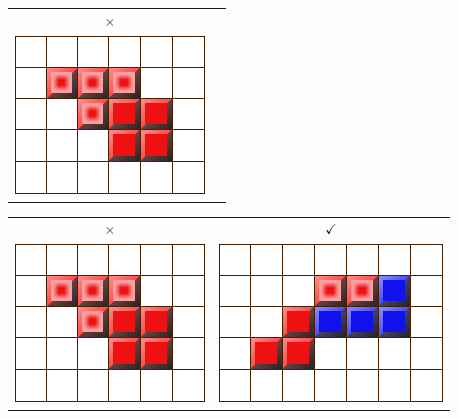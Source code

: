 \documentclass[12pt]{beamer}
\begin{document}
\begin{frame}
\begin{tabular}{c c}
	\huge \color{red} $\times$ & \\
	\includegraphics[width=0.5\linewidth]{media/how2play4.png}
	&
\end{tabular}
\end{frame}
\begin{frame}
\begin{tabular}{c c}
	\huge \color{red} $\times$ & \huge \color{green} $\checkmark$\\
	\includegraphics[width=0.5\linewidth]{media/how2play4.png}
	&
	\includegraphics[width=0.5\linewidth]{media/how2play5.png}
\end{tabular}
\end{frame}
\end{document}
